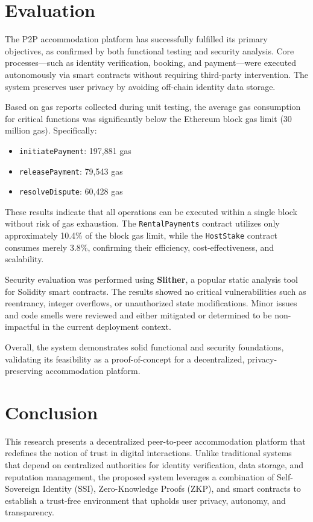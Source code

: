 \documentclass[conference]{IEEEtran}
\begin{document}
\section{Evaluation}
\label{sec:evaluation}

The P2P accommodation platform has successfully fulfilled its primary objectives, as confirmed by both functional testing and security analysis. Core processes—such as identity verification, booking, and payment—were executed autonomously via smart contracts without requiring third-party intervention. The system preserves user privacy by avoiding off-chain identity data storage.

Based on gas reports collected during unit testing, the average gas consumption for critical functions was significantly below the Ethereum block gas limit (30 million gas). Specifically:
\begin{itemize}
  \item \texttt{initiatePayment}: 197,881 gas
  \item \texttt{releasePayment}: 79,543 gas
  \item \texttt{resolveDispute}: 60,428 gas
\end{itemize}

These results indicate that all operations can be executed within a single block without risk of gas exhaustion. The \texttt{RentalPayments} contract utilizes only approximately 10.4\% of the block gas limit, while the \texttt{HostStake} contract consumes merely 3.8\%, confirming their efficiency, cost-effectiveness, and scalability.

Security evaluation was performed using \textbf{Slither}, a popular static analysis tool for Solidity smart contracts. The results showed no critical vulnerabilities such as reentrancy, integer overflows, or unauthorized state modifications. Minor issues and code smells were reviewed and either mitigated or determined to be non-impactful in the current deployment context.

Overall, the system demonstrates solid functional and security foundations, validating its feasibility as a proof-of-concept for a decentralized, privacy-preserving accommodation platform.

\section{Conclusion}
\label{sec:conclusion}
This research presents a decentralized peer-to-peer accommodation platform that redefines the notion of trust in digital interactions. Unlike traditional systems that depend on centralized authorities for identity verification, data storage, and reputation management, the proposed system leverages a combination of Self-Sovereign Identity (SSI), Zero-Knowledge Proofs (ZKP), and smart contracts to establish a trust-free environment that upholds user privacy, autonomy, and transparency.
\end{document}
